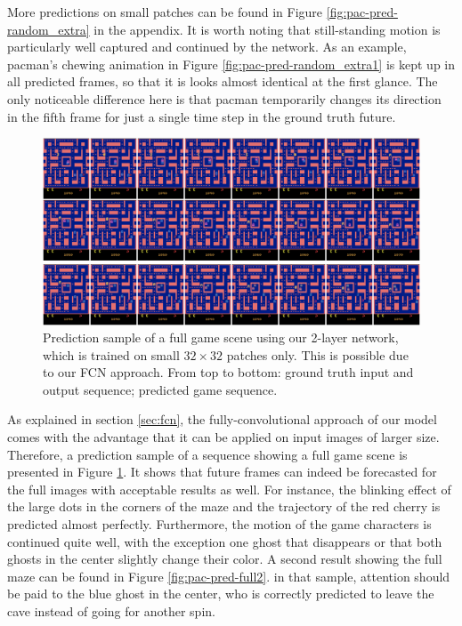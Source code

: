 More predictions on small patches can be found in Figure \ref{fig:pac-pred-random_extra} in the appendix. It is worth noting that still-standing motion is particularly well captured and continued by the network. As an example, pacman's chewing animation in Figure \ref{fig:pac-pred-random_extra1} is kept up in all predicted frames, so that it is looks almost identical at the first glance. The only noticeable difference here is that pacman temporarily changes its direction in the fifth frame for just a single time step in the ground truth future.

\begin{figure}[htpb]
	\centering
	\includegraphics[width=1.0\linewidth]{figures/pred/pac/full/pred-00.png} 
	\caption[Random Full Screen Prediction Sample on MsPacman]{Prediction sample of a full game scene using our 2-layer network, which is trained on small $32 \times 32$ patches only. This is possible due to our FCN approach. From top to bottom: ground truth input and output sequence; predicted game sequence.} \label{fig:pac-pred-full1}
\end{figure}

As explained in section \ref{sec:fcn}, the fully-convolutional approach of our model comes with the advantage that it can be applied on input images of larger size. Therefore, a prediction sample of a sequence showing a full game scene is presented in Figure \ref{fig:pac-pred-full1}. It shows that future frames can indeed be forecasted for the full images with acceptable results as well. For instance, the blinking effect of the large dots in the corners of the maze and the trajectory of the red cherry is predicted almost perfectly. Furthermore, the motion of the game characters is continued quite well, with the exception one ghost that disappears or that both ghosts in the center slightly change their color. A second result showing the full maze can be found in Figure \ref{fig:pac-pred-full2}. in that sample, attention should be paid to the blue ghost in the center, who is correctly predicted to leave the cave instead of going for another spin.

